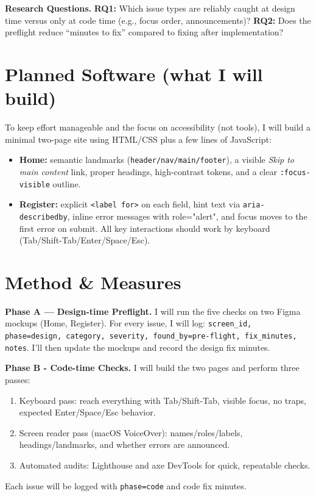 \documentclass[12pt]{article}
\begin{document}
\textbf{Research Questions.} 
\textbf{RQ1:} Which issue types are reliably caught at design time versus only at code time (e.g., focus order, announcements)? 
\textbf{RQ2:} Does the preflight reduce “minutes to fix” compared to fixing after implementation?

\section*{Planned Software (what I will build)}
To keep effort manageable and the focus on accessibility (not tools), I will build a minimal two-page site using HTML/CSS plus a few lines of JavaScript:
\begin{itemize}
  \item \textbf{Home:} semantic landmarks (\texttt{header/nav/main/footer}), a visible \emph{Skip to main content} link, proper headings, high-contrast tokens, and a clear \texttt{:focus-visible} outline.
  \item \textbf{Register:} explicit \texttt{<label for>} on each field, hint text via \texttt{aria-describedby}, inline error messages with role="alert", and focus moves to the first error on submit. All key interactions should work by keyboard (Tab/Shift-Tab/Enter/Space/Esc).
\end{itemize}

\section*{Method \& Measures}
\textbf{Phase A — Design-time Preflight.} I will run the five checks on two Figma mockups (Home, Register). For every issue, I will log: \texttt{screen\_id, phase=design, category, severity, found\_by=pre-flight, fix\_minutes, notes}. I'll then update the mockups and record the design fix minutes.

\textbf{Phase B - Code-time Checks.} I will build the two pages and perform three passes:
\begin{enumerate}
  \item {Keyboard pass:} reach everything with Tab/Shift-Tab, visible focus, no traps, expected Enter/Space/Esc behavior.
  \item {Screen reader pass (macOS VoiceOver):} names/roles/labels, headings/landmarks, and whether errors are announced.
  \item {Automated audits:} Lighthouse and axe DevTools for quick, repeatable checks.
\end{enumerate}
Each issue will be logged with \texttt{phase=code} and code fix minutes. 
\end{document}
